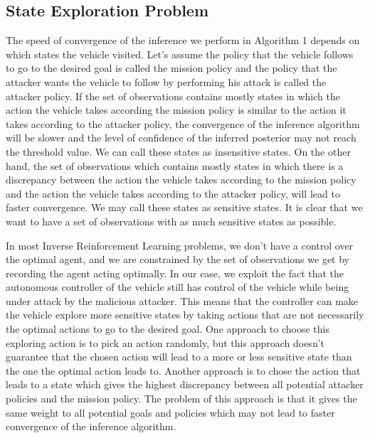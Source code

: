 \documentclass[conference]{IEEEtran}
\begin{document}
\subsection{State Exploration Problem}
The speed of convergence of the inference we perform in Algorithm 1 depends on which states the vehicle visited. Let's assume the policy that the vehicle follows to go to the desired goal is called the mission policy and the policy that the attacker wants the vehicle to follow by performing his attack is called the attacker policy. If the set of observations contains mostly states in which the action the vehicle takes according the mission policy is similar to the action it takes according to the attacker policy, the convergence of the inference algorithm will be slower and the level of confidence of the inferred posterior may not reach the threshold value. We can call these states as insensitive states. On the other hand, the set of observations which contains mostly states in which there is a discrepancy between the action the vehicle takes according to the mission policy and the action the vehicle takes according to the attacker policy, will lead to faster convergence. We may call these states as sensitive states. It is clear that we want to have a set of observations with as much sensitive states as possible.

In most Inverse Reinforcement Learning problems, we don't have a control over the optimal agent, and we are constrained by the set of observations we get by recording the agent acting optimally. In our case, we exploit the fact that the autonomous controller of the vehicle still has control of the vehicle while being under attack by the malicious attacker. This means that the controller can make the vehicle explore more sensitive states by taking actions that are not necessarily the optimal actions to go to the desired goal. One approach to choose this exploring action is to pick an action randomly, but this approach doesn't guarantee that the chosen action will lead to a more or less sensitive state than the one the optimal action leads to. Another approach is to chose the action that leads to a state which gives the highest discrepancy between all potential attacker policies and the mission policy. The problem of this approach is that it gives the same weight to all potential goals and policies which may not lead to faster convergence of the inference algorithm.
\end{document}
